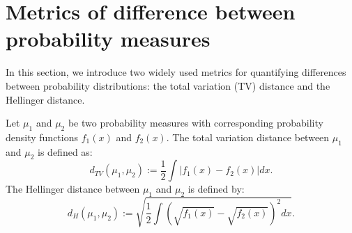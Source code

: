 \documentclass[preprint,3p,times]{elsarticle}
\begin{document}
 


\newpage

\appendix
\section{Metrics of difference between probability measures}
\label{app:metrics_dist}
In this section, we introduce two widely used metrics for quantifying differences between probability distributions: the total variation (TV) distance and the Hellinger distance. 

Let $\mu_1$ and $\mu_2$ be two probability measures with corresponding probability density functions $f_1(x)$ and $f_2(x)$. The total variation distance between $\mu_1$ and $\mu_2$ is defined as:
\begin{equation}
d_{TV}(\mu_1,\mu_2) := \frac{1}{2}\int \big \lvert f_1(x) - f_2(x) \big \rvert dx.
\end{equation}
The Hellinger distance between $\mu_1$ and $\mu_2$ is defined by:
\begin{equation}
d_{H}(\mu_1,\mu_2) := \sqrt{\frac{1}{2}\int \left( \sqrt{f_1(x)} - \sqrt{f_2(x) }\right)^2 dx}.
\end{equation}
\end{document}
